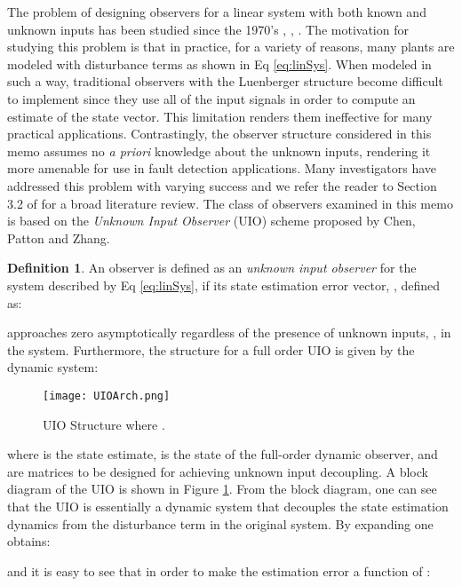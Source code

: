 \documentclass{amsart}
\theoremstyle{definition}
\newtheorem{definition}[theorem]{Definition}
\theoremstyle{remark}
\numberwithin{equation}{section}
\begin{document}
The problem of designing observers for a linear system with both known and unknown inputs has been studied since the 1970's \cite{Chen99}, \cite{Pat89}, \cite{Shaf2015}.  The motivation for studying this problem is that in practice, for a variety of reasons, many plants are modeled with disturbance terms as shown in Eq \ref{eq:linSys}. When modeled in such a way, traditional observers with the Luenberger structure become difficult to implement since they use all of the input signals in order to compute an estimate of the state vector. This limitation renders them ineffective for many practical applications. Contrastingly, the observer structure considered in this memo assumes no \textit{a priori} knowledge about the unknown inputs, rendering it more amenable for use in fault detection applications. Many investigators have addressed this problem with varying success and we refer the reader to Section 3.2 of \cite{Chen99} for a broad literature review. The class of observers examined in this memo is based on the \textit{Unknown Input Observer} (UIO) scheme proposed by Chen, Patton and Zhang.  

\begin{definition}
An observer is defined as an \textit{unknown input observer} \cite{Sch12,Pat89} for the system described by Eq \ref{eq:linSys}, if its state estimation error vector, , defined as:



approaches zero asymptotically regardless of the presence of unknown inputs, , in the system.  Furthermore, the structure for a full order UIO is given by the dynamic system: 


\end{definition}

\begin{figure}[H]
    \centering
    \texttt{[image: UIOArch.png]}
    \caption{UIO Structure where .}
    \label{fig:UIOBD}
\end{figure}

where  is the state estimate,  is the state of the full-order dynamic observer, and  are matrices to be designed for achieving unknown input decoupling. A block diagram of the UIO is shown in Figure \ref{fig:UIOBD}.  From the block diagram, one can see that the UIO is essentially a dynamic system that decouples the state estimation dynamics from the disturbance term in the original system. By expanding  one obtains: 



and it is easy to see that in order to make the estimation error a function of :
\end{document}
